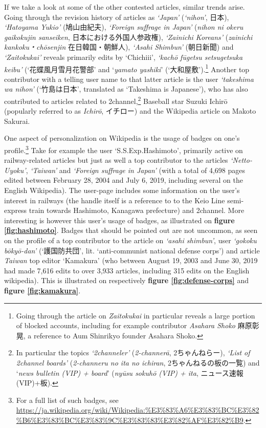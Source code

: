 \documentclass[10pt,british,A4paper,,openany]{memoir}
\begin{document}
If we take a look at some of the other contested articles, similar
trends arise. Going through the revision history of articles as
\emph{`Japan'} (\emph{`nihon'}, 日本), \emph{`Hatoyama Yukio'}
(鳩山由紀夫), \emph{`Foreign suffrage in Japan'} (\emph{nihon ni okeru
gaikokujin sanseiken}, 日本における外国人参政権), \emph{`Zainichi
Koreans'} (\emph{zainichi kankoku・chōsenjin} 在日韓国・朝鮮人),
\emph{`Asahi Shimbun'} (朝日新聞) and \emph{`Zaitokukai'} reveals
primarily edits by `Chichiii', \emph{`kachō fūgetsu setsugetsuka keibu'}
(`花蝶風月雪月花警部' and `\emph{yamato yashiki}'
(`大和屋敷').\footnote{Going through the article on \emph{Zaitokukai} in
  particular reveals a large portion of blocked accounts, including for
  example contributor \emph{Asahara Shoko} 麻原彰晃, a reference to Aum
  Shinrikyo founder Asahara Shoko.} Another top contributor with a
telling user name to that latter article is the user \emph{`takeshima wa
nihon'} (`竹島は日本', translated as `Takeshima is Japanese'), who has
also contributed to articles related to 2channel,\footnote{In particular
  the topics \emph{`2channeler'} (\emph{2-channerā}, 2ちゃんねらー),
  \emph{`List of \emph{2channel} boards'} (\emph{2-channeru no ita no
  ichiran}, 2ちゃんねるの板の一覧) and `\emph{news bulletin (VIP) +
  board}' (\emph{nyūsu sokuhō (VIP) + ita}, ニュース速報(VIP)+板).}
Baseball star Suzuki Ichirō (popularly referred to as \emph{Ichirō},
イチロー) and the Wikipedia article on Makoto Sakurai.

One aspect of personalization on Wikipedia is the usage of badges on
one's profile.\footnote{For a full list of such badges, see
  \url{https://ja.wikipedia.org/wiki/Wikipedia:\%E3\%83\%A6\%E3\%83\%BC\%E3\%82\%B6\%E3\%83\%BC\%E3\%83\%9C\%E3\%83\%83\%E3\%82\%AF\%E3\%82\%B9}.}
Take for example the user `S.S.Exp.Hashimoto', primarily active on
railway-related articles but just as well a top contributor to the
articles \emph{`Netto-Uyoku'}, \emph{`Taiwan'} and \emph{`Foreign
suffrage in Japan'} (with a total of 4,698 pages edited between February
28, 2004 and July 6, 2019, including several on the English Wikipedia).
The user-page includes some information on the user's interest in
railways (the handle itself is a reference to to the Keio Line
semi-express train towards Hashimoto, Kanagawa prefecture) and 2channel.
More interesting is however this user's usage of badges, as illustrated
on \textbf{figure \ref{fig:hashimoto}}. Badges that should be pointed
out are not uncommon, as seen on the profile of a top contributor to the
article on \emph{`asahi shimbun'}, user \emph{`gokoku bōkyō-dan'}
(`護国防共団', lit. `anti-communist national defense corps') and article
\emph{Taiwan} top editor `Kamakura' (who between August 19, 2003 and
June 30, 2019 had made 7,616 edits to over 3,933 articles, including 315
edits on the English wikipedia). This is illustrated on respectively
\textbf{figure \ref{fig:defense-corps}} and \textbf{figure
\ref{fig:kamakura}}.
\end{document}

